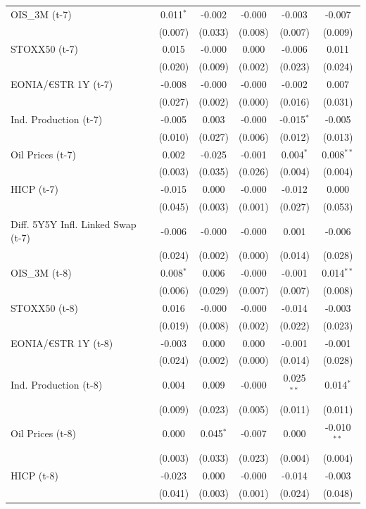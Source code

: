 \begin{longtable}[t]{lccccc}
OIS\_3M (t-7) & 0.011$^{*}$ & -0.002 & -0.000 & -0.003 & -0.007\\
 & (0.007) & (0.033) & (0.008) & (0.007) & (0.009)\\
STOXX50 (t-7) & 0.015 & -0.000 & 0.000 & -0.006 & 0.011\\
 & (0.020) & (0.009) & (0.002) & (0.023) & (0.024)\\
EONIA/€STR 1Y (t-7) & -0.008 & -0.000 & -0.000 & -0.002 & 0.007\\
 & (0.027) & (0.002) & (0.000) & (0.016) & \vphantom{1} (0.031)\\
Ind. Production (t-7) & -0.005 & 0.003 & -0.000 & -0.015$^{*}$ & -0.005\\
 & (0.010) & (0.027) & (0.006) & (0.012) & (0.013)\\
Oil Prices (t-7) & 0.002 & -0.025 & -0.001 & 0.004$^{*}$ & 0.008$^{**}$\\
 & (0.003) & (0.035) & (0.026) & (0.004) & (0.004)\\
HICP (t-7) & -0.015 & 0.000 & -0.000 & -0.012 & 0.000\\
 & (0.045) & (0.003) & (0.001) & (0.027) & (0.053)\\
Diff. 5Y5Y Infl. Linked Swap (t-7) & -0.006 & -0.000 & -0.000 & 0.001 & -0.006\\
 & (0.024) & (0.002) & (0.000) & (0.014) & \vphantom{1} (0.028)\\
OIS\_3M (t-8) & 0.008$^{*}$ & 0.006 & -0.000 & -0.001 & 0.014$^{**}$\\
 & (0.006) & (0.029) & (0.007) & (0.007) & (0.008)\\
STOXX50 (t-8) & 0.016 & -0.000 & -0.000 & -0.014 & -0.003\\
 & (0.019) & (0.008) & (0.002) & (0.022) & (0.023)\\
EONIA/€STR 1Y (t-8) & -0.003 & 0.000 & 0.000 & -0.001 & -0.001\\
 & (0.024) & (0.002) & (0.000) & (0.014) & (0.028)\\
Ind. Production (t-8) & 0.004 & 0.009 & -0.000 & 0.025$^{**}$ & 0.014$^{*}$\\
 & (0.009) & (0.023) & (0.005) & (0.011) & (0.011)\\
Oil Prices (t-8) & 0.000 & 0.045$^{*}$ & -0.007 & 0.000 & -0.010$^{**}$\\
 & (0.003) & (0.033) & (0.023) & (0.004) & (0.004)\\
HICP (t-8) & -0.023 & 0.000 & -0.000 & -0.014 & -0.003\\
 & (0.041) & (0.003) & (0.001) & (0.024) & (0.048)\\

\end{longtable}
